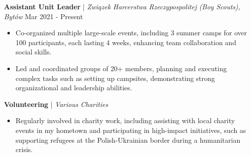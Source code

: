 \documentclass{article}
\renewcommand{\subsection}[3]{
    \noindent\textbf{#1} | \emph{#2} \hfill #3
}
\begin{document}
    \subsection{Assistant Unit Leader}{Związek Harcerstwa Rzeczypospolitej (Boy Scouts), Bytów}{Mar 2021 - Present}
    \begin{itemize}
        \item Co-organized multiple large-scale events, including 3 summer camps for over 100 participants, each lasting 4 weeks, enhancing team collaboration and social skills.
        \item Led and coordinated groups of 20+ members, planning and executing complex tasks such as setting up campsites, demonstrating strong organizational and leadership abilities.
    \end{itemize}

    \subsection{Volunteering}{Various Charities}{}
    \begin{itemize}
        \item Regularly involved in charity work, including assisting with local charity events in my hometown and participating in high-impact initiatives, such as supporting refugees at the Polish-Ukrainian border during a humanitarian crisis.
    \end{itemize}
    
    \vspace{0.75em}
\end{document}

